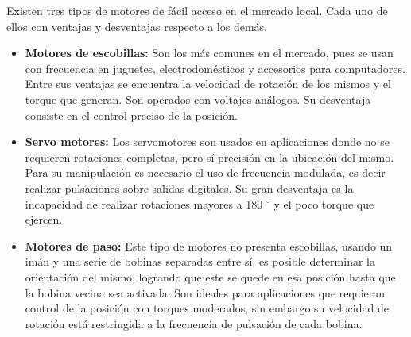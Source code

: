Existen tres tipos de motores de fácil acceso en el mercado local. Cada uno de ellos con ventajas y desventajas respecto a los demás.
\begin{itemize}
	\item \textbf{Motores de escobillas:} Son los más comunes en el mercado, pues se usan con frecuencia en juguetes, electrodomésticos y accesorios para computadores. Entre sus ventajas se encuentra la velocidad de rotación de los mismos y el torque que generan. Son operados con voltajes análogos. Su desventaja consiste en el control preciso de la posición.  
	\item \textbf{Servo motores:} Los servomotores son usados en aplicaciones donde no se requieren rotaciones completas, pero sí precisión en la ubicación del mismo. Para su manipulación es necesario el uso de frecuencia modulada, es decir realizar pulsaciones sobre salidas digitales. Su gran desventaja es la incapacidad de realizar rotaciones mayores a 180 $^\circ$ y el poco torque que ejercen.
	\item \textbf{Motores de paso:} Este tipo de motores no presenta escobillas, usando un imán y una serie de bobinas separadas entre sí, es posible determinar la orientación del mismo, logrando que este se quede en esa posición hasta que la bobina vecina sea activada. Son ideales para aplicaciones que requieran control de la posición con torques moderados, sin embargo su velocidad de rotación está restringida a la frecuencia de pulsación de cada bobina.
	

\end{itemize}
